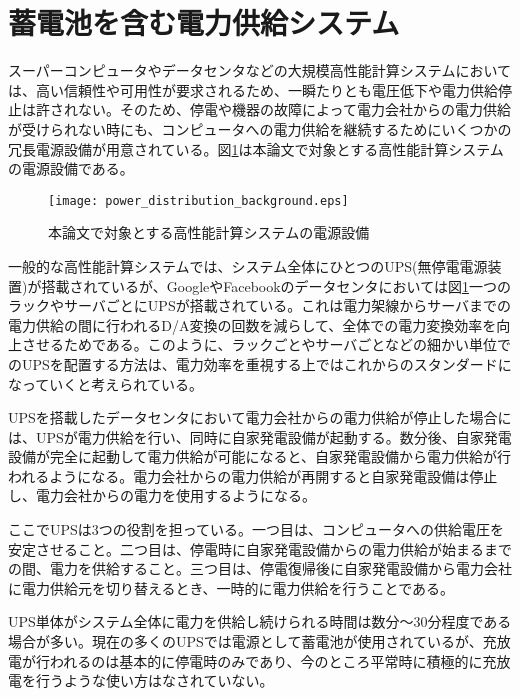 


\section{蓄電池を含む電力供給システム}
\label{sec:ups}

スーパーコンピュータやデータセンタなどの大規模高性能計算システムにおいては、高い信頼性や可用性が要求されるため、一瞬たりとも電圧低下や電力供給停止は許されない。そのため、停電や機器の故障によって電力会社からの電力供給が受けられない時にも、コンピュータへの電力供給を継続するためにいくつかの冗長電源設備が用意されている。図\ref{fig:power_distribution_background}は本論文で対象とする高性能計算システムの電源設備である。
\begin{figure}[t]
 \begin{center}
  \texttt{[image: power\_distribution\_background.eps]}
 \end{center}
 \caption{本論文で対象とする高性能計算システムの電源設備}
 \label{fig:power_distribution_background}
\end{figure}

一般的な高性能計算システムでは、システム全体にひとつのUPS(無停電電源装置)が搭載されているが、GoogleやFacebookのデータセンタにおいては図\ref{fig:power_distribution_background}一つのラックやサーバごとにUPSが搭載されている\cite{Datacenter}。これは電力架線からサーバまでの電力供給の間に行われるD/A変換の回数を減らして、全体での電力変換効率を向上させるためである。このように、ラックごとやサーバごとなどの細かい単位でのUPSを配置する方法は、電力効率を重視する上ではこれからのスタンダードになっていくと考えられている。

UPSを搭載したデータセンタにおいて電力会社からの電力供給が停止した場合には、UPSが電力供給を行い、同時に自家発電設備が起動する。数分後、自家発電設備が完全に起動して電力供給が可能になると、自家発電設備から電力供給が行われるようになる。電力会社からの電力供給が再開すると自家発電設備は停止し、電力会社からの電力を使用するようになる。

ここでUPSは3つの役割を担っている。一つ目は、コンピュータへの供給電圧を安定させること。二つ目は、停電時に自家発電設備からの電力供給が始まるまでの間、電力を供給すること。三つ目は、停電復帰後に自家発電設備から電力会社に電力供給元を切り替えるとき、一時的に電力供給を行うことである。

UPS単体がシステム全体に電力を供給し続けられる時間は数分〜30分程度である場合が多い。現在の多くのUPSでは電源として蓄電池が使用されているが、充放電が行われるのは基本的に停電時のみであり、今のところ平常時に積極的に充放電を行うような使い方はなされていない。



